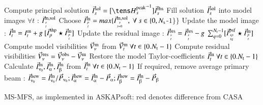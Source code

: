 \documentclass[11pt,a4paper,variablewidth]{article}
\begin{document}
\begin{algorithm}
{{{{          Compute principal solution $\I^{\rm sol}_s = [{\He^{\rm peak}_s}^{-1}] \I^{\rm rhs}_s$\;
          Fill solution ${\vec{I}}^{\rm sol}_s$ into model images $\forall t$ : ${\vec{I}}^{\rm m,sol}_{{s}\atop{t}}$
       }
     }
     Choose ${\vec{I}}^{\rm m}_{{p}\atop{t}} = max\{{\vec{I}}^{\rm m,sol}_{{s}\atop{t=0}},~\forall~s\in\{0,N_{\rm s} $-$1\}\}$ \;
       {
        Update the model image : ${\vec{I}}^{\rm m}_t = I^{\rm m}_t + g ~[ {\vec{I}}^{\rm shp}_{p} \star {\vec{I}}^{\rm m}_{{p}\atop{t}}]$ \;
	{
          Update the residual image : ${\vec{I}}^{\rm res}_{{s}\atop{t}} = {\vec{I}}^{\rm res}_{{s}\atop{t}} - g ~\sum_{q=0}^{N_{\rm t} -1}[{\vec{I}}^{\rm psf}_{{sp}\atop{tq}} \star {\vec{I}}^{\rm m}_{{p}\atop{t}}]$\;
	}
       }
    }
   {\color{red} Compute model visibilities $\vec{V}^{\rm m}_{\nu}$ from  $\vec{V}^{\rm m}_t~\forall t\in \{0.N_{\rm t} -1\}$}\;
   Compute residual visibilities $\vec{V}^{\rm res}_{\nu} = \vec{V}^{\rm obs}_{\nu}-\vec{V}^{\rm m}_{\nu}$\;
  } 
Restore the model Taylor-coefficients ${\vec{I}}^{\rm m}_t~\forall t\in \{0.N_{\rm t} -1\}$ \;
Calculate $\vec{I}^{\rm m}_{\nuup_0}, \vec{I}^{\rm m}_{\alphaup}, \vec{I}^{\rm m}_{\betaup}$ from ${\vec{I}}^{\rm m}_t~\forall t\in \{0.N_{\rm t} -1\}$\;
If required, remove average primary beam : $\vec{I}^{\rm new}_{\nuup_0}=\vec{I}^{\rm m}_{\nuup_0}/\vec{P}_{\nuup_0};  \vec{I}^{\rm new}_{\alphaup}=\vec{I}^{\rm m}_{\alphaup}-\vec{P}_{\alphaup};  \vec{I}^{\rm new}_{\betaup}=\vec{I}^{\rm m}_{\betaup}-\vec{P}_{\betaup}$\;

  \caption[MS-MFS Algorithm]
         {MS-MFS, as implemented in ASKAPsoft: {\color{red} red denotes difference from CASA}}\label{algo:ASKAP}

\end{algorithm}
\end{document}
